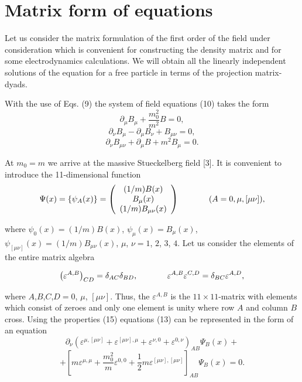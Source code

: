 \documentclass[a4paper,12pt]{article}
\begin{document}
\section{Matrix form of equations}

Let us consider the matrix formulation of the first order of the
field under consideration which is convenient for constructing the
density matrix and for some electrodynamics calculations. We will
obtain all the linearly independent solutions of the equation for
a free particle in terms of the projection matrix-dyads.

With the use of Eqs. (9) the system of field equations (10) takes
the form
\[
\partial _\mu B_\mu +\frac{m_0^2}{m^2}B=0,
\]
\begin{equation}
\partial _\nu B_\mu-\partial _\mu B_\nu+B_{\mu \nu }=0, \label{13}
\end{equation}
\[
\partial _\nu B_{\mu \nu }+\partial _\mu B+m^2 B_\mu =0.
\]

At $m_0=m$ we arrive at the massive Stueckelberg field [3]. It is
convenient to introduce the 11-dimensional function
\begin{equation}
\Psi (x)=\left\{ \psi _A(x)\right\} =\left(
\begin{array}{c}
(1/m)B(x) \\
B _\mu (x) \\
(1/m)B _{\mu \nu}(x)
\end{array}
\right) \hspace{0.5in}(A=0, \mu , [\mu \nu ]), \label{14}
\end{equation}

where $\psi_0 (x)=(1/m)B(x)$, $\psi_\mu (x)=B_\mu (x)$,
$\psi_{[\mu\nu]}(x)=(1/m)B_{\mu \nu}(x)$, $\mu$, $\nu =1$, $2$,
$3$, $4$. Let us consider the elements of the entire matrix
algebra

\begin{equation}
\left( \varepsilon ^{A,B}\right) _{CD}=\delta _{AC} \delta _{BD},
\hspace{0.5in}\varepsilon ^{A,B}\varepsilon ^{C,D}= \delta
_{BC}\varepsilon^{A,D}, \label{15}
\end{equation}

where $A$,$B$,$C$,$D=0$, $\mu$, $[\mu\nu]$. Thus, the $\varepsilon
^{A,B}$ is the $11\times11$-matrix with elements which consist of
zeroes and only one element is unity where row $A$ and column $B$
cross. Using the properties (15) equations (13) can be represented
in the form of an equation
\[
\partial _\nu \left( \varepsilon ^{\mu ,[\mu \nu ]}+\varepsilon ^{[\mu \nu
],\mu }+\varepsilon ^{\nu ,0}+\varepsilon ^{0,\nu }\right)
_{AB}\Psi _B(x)+
\]
\vspace{-8mm}
\begin{equation}
\label{16}
\end{equation}
\vspace{-8mm}
\[
+\left[ m\varepsilon ^{\mu ,\mu }+\frac{m_0^2}{m} \varepsilon
^{0,0}+\frac 12 m\varepsilon ^{[\mu \nu ],[\mu \nu ]} \right]
_{AB}\Psi _B(x)=0.
\]
\end{document}
